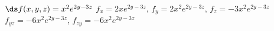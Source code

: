 {$\ds f(x,y,z) = x^2e^{2y-3z}$}
{$f_x = 2xe^{2y-3z}$, $f_y = 2x^2e^{2y-3z}$, $f_z = -3x^2e^{2y-3z}$\\
$f_{yz} = -6x^2e^{2y-3z}$, $f_{zy} = -6x^2e^{2y-3z}$
}